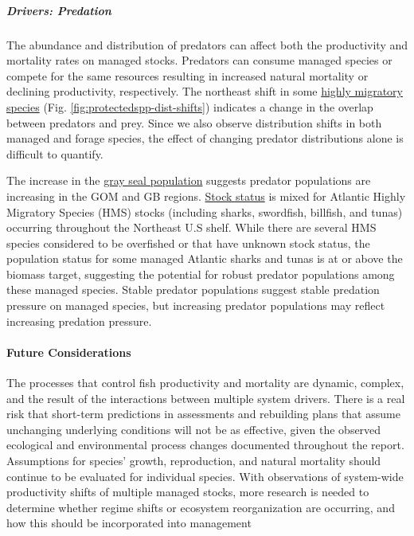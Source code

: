 \documentclass[
  10pt,
]{article}
\begin{document}
\hypertarget{drivers-predation}{%
\subparagraph{Drivers: Predation}\label{drivers-predation}}

The abundance and distribution of predators can affect both the productivity and mortality rates on managed stocks. Predators can consume managed species or compete for the same resources resulting in increased natural mortality or declining productivity, respectively. The northeast shift in some \href{https://noaa-edab.github.io/catalog/HMS_species_distribution.html}{highly migratory species} (Fig. \ref{fig:protectedspp-dist-shifts}) indicates a change in the overlap between predators and prey. Since we also observe distribution shifts in both managed and forage species, the effect of changing predator distributions alone is difficult to quantify.

The increase in the \href{https://noaa-edab.github.io/catalog/grayseal.html}{gray seal population} suggests predator populations are increasing in the GOM and GB regions. \href{https://noaa-edab.github.io/catalog/hms_stock_status.html}{Stock status} is mixed for Atlantic Highly Migratory Species (HMS) stocks (including sharks, swordfish, billfish, and tunas) occurring throughout the Northeast U.S shelf. While there are several HMS species considered to be overfished or that have unknown stock status, the population status for some managed Atlantic sharks and tunas is at or above the biomass target, suggesting the potential for robust predator populations among these managed species. Stable predator populations suggest stable predation pressure on managed species, but increasing predator populations may reflect increasing predation pressure.

\hypertarget{future-considerations-2}{%
\paragraph{Future Considerations}\label{future-considerations-2}}

The processes that control fish productivity and mortality are dynamic, complex, and the result of the interactions between multiple system drivers. There is a real risk that short-term predictions in assessments and rebuilding plans that assume unchanging underlying conditions will not be as effective, given the observed ecological and environmental process changes documented throughout the report. Assumptions for species' growth, reproduction, and natural mortality should continue to be evaluated for individual species. With observations of system-wide productivity shifts of multiple managed stocks, more research is needed to determine whether regime shifts or ecosystem reorganization are occurring, and how this should be incorporated into management
\end{document}
